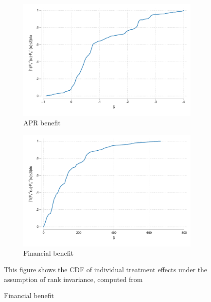\begin{figure}
        \caption{Distribution of treatment effects under rank invariance.}
    \label{te_rankinvariance}
    
    \begin{center}
       \begin{subfigure}{0.49\textwidth}
        \caption{APR benefit}
        \centering
        \includegraphics[width=\textwidth]{Figuras/te_rankinvariance_apr.pdf}
    \end{subfigure} 
   \begin{subfigure}{0.49\textwidth}
        \caption{Financial benefit}
        \centering
        \includegraphics[width=\textwidth]{Figuras/te_rankinvariance_fc_admin.pdf}
    \end{subfigure} 
    \end{center}
    \scriptsize This figure shows the CDF of individual treatment effects under the assumption of rank invariance, computed from 

\end{figure}
